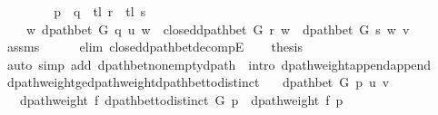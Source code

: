 \begin{isabellebody}
\endisataginvisible
{\isafoldinvisible}%
%
\isadeliminvisible
\isanewline
%
\endisadeliminvisible
%
\isadelimproof
%
\endisadelimproof
%
\isatagproof
{}\isamarkupfalse%
\ {\isacharminus}{\kern0pt}\isanewline
\ \ \isamarkupfalse%
\isanewline
\ \ \ \ {\isachardoublequoteopen}p\ {\isacharequal}{\kern0pt}\ q\ {\isacharat}{\kern0pt}\ tl\ r\ {\isacharat}{\kern0pt}\ tl\ s{\isachardoublequoteclose}\isanewline
\ \ \ \ {\isachardoublequoteopen}{\isasymexists}w{\isachardot}{\kern0pt}\ dpath{\isacharunderscore}{\kern0pt}bet\ G\ q\ u\ w\ {\isasymand}\ closed{\isacharunderscore}{\kern0pt}dpath{\isacharunderscore}{\kern0pt}bet\ G\ r\ w\ {\isasymand}\ dpath{\isacharunderscore}{\kern0pt}bet\ G\ s\ w\ v{\isachardoublequoteclose}\isanewline
\ \ \ \ \isamarkupfalse%
\ assms\isanewline
\ \ \ \ \isamarkupfalse%
\ {\isacharparenleft}{\kern0pt}elim\ closed{\isacharunderscore}{\kern0pt}dpath{\isacharunderscore}{\kern0pt}bet{\isacharunderscore}{\kern0pt}decompE{\isacharunderscore}{\kern0pt}{}{\isacharparenright}{\kern0pt}\isanewline
\ \ \isamarkupfalse%
\ {\isacharquery}{\kern0pt}thesis\isanewline
\ \ \ \ \isamarkupfalse%
\ {\isacharparenleft}{\kern0pt}auto\ simp\ add{\isacharcolon}{\kern0pt}\ dpath{\isacharunderscore}{\kern0pt}bet{\isacharunderscore}{\kern0pt}nonempty{\isacharunderscore}{\kern0pt}dpath{\isacharparenleft}{\kern0pt}{}{\isacharcomma}{\kern0pt}\ {}{\isacharparenright}{\kern0pt}\ intro{\isacharcolon}{\kern0pt}\ dpath{\isacharunderscore}{\kern0pt}weight{\isacharunderscore}{\kern0pt}append{\isacharunderscore}{\kern0pt}append{\isacharparenright}{\kern0pt}\isanewline
{}\isamarkupfalse%
%
\endisatagproof
{\isafoldproof}%
%
\isadelimproof
\isanewline
%
\endisadelimproof
%
\isadeliminvisible
\isanewline
%
\endisadeliminvisible
%
\isataginvisible
{}\isamarkupfalse%
\ dpath{\isacharunderscore}{\kern0pt}weight{\isacharunderscore}{\kern0pt}ge{\isacharunderscore}{\kern0pt}dpath{\isacharunderscore}{\kern0pt}weight{\isacharunderscore}{\kern0pt}dpath{\isacharunderscore}{\kern0pt}bet{\isacharunderscore}{\kern0pt}to{\isacharunderscore}{\kern0pt}distinct{\isacharcolon}{\kern0pt}\isanewline
\ \ \ {\isachardoublequoteopen}dpath{\isacharunderscore}{\kern0pt}bet\ G\ p\ u\ v{\isachardoublequoteclose}\isanewline
\ \ \ {\isachardoublequoteopen}dpath{\isacharunderscore}{\kern0pt}weight\ f\ {\isacharparenleft}{\kern0pt}dpath{\isacharunderscore}{\kern0pt}bet{\isacharunderscore}{\kern0pt}to{\isacharunderscore}{\kern0pt}distinct\ G\ p{\isacharparenright}{\kern0pt}\ {\isasymle}\ dpath{\isacharunderscore}{\kern0pt}weight\ f\ p{\isachardoublequoteclose}%

\end{isabellebody}
